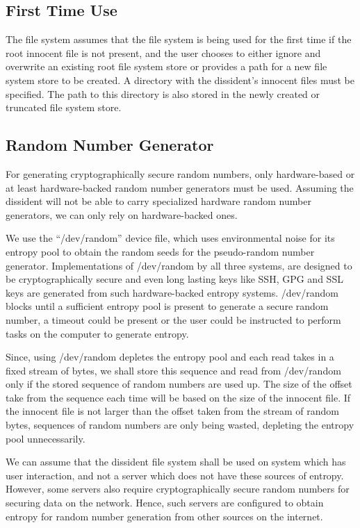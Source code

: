 \documentclass[10pt,onecolumn]{article}
\begin{document}
\subsection{First Time Use}

The file system assumes that the file system is being used for the first time if the root innocent file is not present, and the user chooses to either ignore and overwrite an existing root file system store or provides a path for a new file system store to be created. A directory with the dissident's innocent files must be specified. The path to this directory is also stored in the newly created or truncated file system store. 

\subsection{Random Number Generator}

For generating cryptographically secure random numbers, only hardware-based or at least hardware-backed random number generators must be used. Assuming the dissident will not be able to carry specialized hardware random number generators, we can only rely on hardware-backed ones. 

We use the “/dev/random” device file, which uses environmental noise for its entropy pool to obtain the random seeds for the pseudo-random number generator. Implementations of /dev/random by all three systems, are designed to be cryptographically secure and even long lasting keys like SSH, GPG and SSL keys are generated from such hardware-backed entropy systems. /dev/random blocks until a sufficient entropy pool is present to generate a secure random number, a timeout could be present or the user could be instructed to perform tasks on the computer to generate entropy. 

Since, using /dev/random depletes the entropy pool and each read takes in a fixed stream of bytes, we shall store this sequence and read from /dev/random only if the stored sequence of random numbers are used up. The size of the offset take from the sequence each time will be based on the size of the innocent file. If the innocent file is not larger than the offset taken from the stream of random bytes, sequences of random numbers are only being wasted, depleting the entropy pool unnecessarily. 

We can assume that the dissident file system shall be used on system which has user interaction, and not a server which does not have these sources of entropy. However, some servers also require cryptographically secure random numbers for securing data on the network. Hence, such servers are configured to obtain entropy for random number generation from other sources on the internet. 
\end{document}
